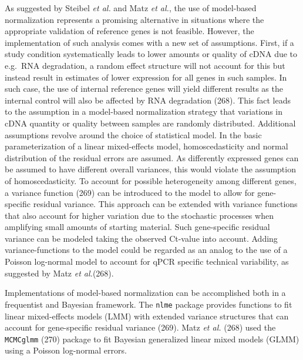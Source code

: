 \documentclass[twoside,10pt]{gihclass} %
\begin{document}
As suggested by Steibel \emph{et al.} and Matz \emph{et al.}, the use of model-based normalization represents a promising alternative in situations where the appropriate validation of reference genes is not feasible.
However, the implementation of such analysis comes with a new set of assumptions.
First, if a study condition systematically leads to lower amounts or quality of cDNA due to e.g.~RNA degradation, a random effect structure will not account for this but instead result in estimates of lower expression for all genes in such samples. In such case, the use of internal reference genes will yield different results as the internal control will also be affected by RNA degradation
(268).
This fact leads to the assumption in a model-based normalization strategy that variations in cDNA quantity or quality between samples are randomly distributed.
Additional assumptions revolve around the choice of statistical model.
In the basic parameterization of a linear mixed-effects model, homoscedasticity and normal distribution of the residual errors are assumed.
As differently expressed genes can be assumed to have different overall variances, this would violate the assumption of homoscedasticity. To account for possible heterogeneity among different genes, a variance function
(269)
can be introduced to the model to allow for gene-specific residual variance. This approach can be extended with variance functions that also account for higher variation due to the stochastic processes when amplifying small amounts of starting material.
Such gene-specific residual variance can be modeled taking the observed Ct-value into account.
Adding variance-functions to the model could be regarded as an analog to the use of a Poisson log-normal model to account for qPCR specific technical variability, as suggested by Matz \emph{et al.}(268).

Implementations of model-based normalization can be accomplished both in a frequentist and Bayesian framework.
The \texttt{nlme} package provides functions to fit linear mixed-effects models (LMM) with extended variance structures that can account for gene-specific residual variance (269).
Matz \emph{et al.} (268) used the \texttt{MCMCglmm} (270) package to fit Bayesian generalized linear mixed models (GLMM) using a Poisson log-normal errors.
\end{document}
